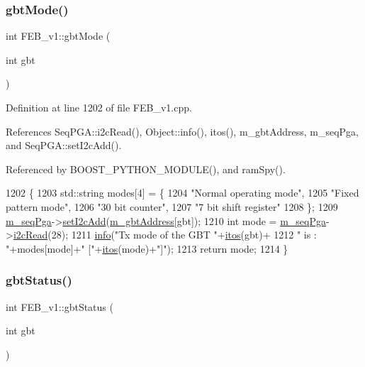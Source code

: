 \subsubsection{\texorpdfstring{gbt\+Mode()}{gbtMode()}}
{\footnotesize\ttfamily int F\+E\+B\+\_\+v1\+::gbt\+Mode (\begin{DoxyParamCaption}\item[{int}]{gbt }\end{DoxyParamCaption})}



Definition at line 1202 of file F\+E\+B\+\_\+v1.\+cpp.



References Seq\+P\+G\+A\+::i2c\+Read(), Object\+::info(), itos(), m\+\_\+gbt\+Address, m\+\_\+seq\+Pga, and Seq\+P\+G\+A\+::set\+I2c\+Add().



Referenced by B\+O\+O\+S\+T\+\_\+\+P\+Y\+T\+H\+O\+N\+\_\+\+M\+O\+D\+U\+L\+E(), and ram\+Spy().


\begin{DoxyCode}
1202                             \{
1203   std::string modes[4] = \{
1204     \textcolor{stringliteral}{"Normal operating mode"},
1205     \textcolor{stringliteral}{"Fixed pattern mode"},
1206     \textcolor{stringliteral}{"30 bit counter"},
1207     \textcolor{stringliteral}{"7 bit shift register"}
1208   \};
1209   \hyperlink{classFEB__v1_a6c7804ac86796f233a8393043adf2e77}{m\_seqPga}->\hyperlink{classSeqPGA_a4ef334e4d2cb417b49033dce951728cd}{setI2cAdd}(\hyperlink{classFEB__v1_ac625855df976f16694178f1a4c0eef1e}{m\_gbtAddress}[gbt]);
1210   \textcolor{keywordtype}{int} mode = \hyperlink{classFEB__v1_a6c7804ac86796f233a8393043adf2e77}{m\_seqPga}->\hyperlink{classSeqPGA_a7cd344df2be99f3a02b487f80e87b27e}{i2cRead}(28);
1211   \hyperlink{classObject_a644fd329ea4cb85f54fa6846484b84a8}{info}(\textcolor{stringliteral}{"Tx mode of the GBT "}+\hyperlink{Tools_8h_af330027dbdafb9a30768b3613c553e60}{itos}(gbt)+
1212        \textcolor{stringliteral}{" is : "}+modes[mode]+\textcolor{stringliteral}{" ["}+\hyperlink{Tools_8h_af330027dbdafb9a30768b3613c553e60}{itos}(mode)+\textcolor{stringliteral}{"]"});
1213   \textcolor{keywordflow}{return} mode; 
1214 \}
\end{DoxyCode}
\mbox{\label{classFEB__v1_a7b47a1b2c7af459b211eed59f4dbe9a7}} 
\subsubsection{\texorpdfstring{gbt\+Status()}{gbtStatus()}}
{\footnotesize\ttfamily int F\+E\+B\+\_\+v1\+::gbt\+Status (\begin{DoxyParamCaption}\item[{int}]{gbt }\end{DoxyParamCaption})}



